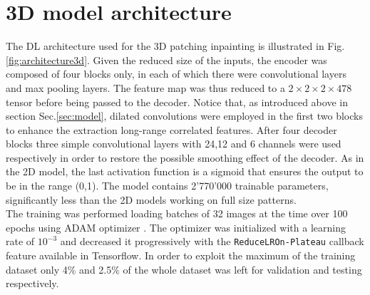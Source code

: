 \section{3D model architecture}

The DL architecture used for the 3D patching inpainting is illustrated in Fig. \ref{fig:architecture3d}.  
Given the reduced size of the inputs, the encoder was composed of four blocks only, in each of which there
were convolutional layers and max pooling layers. The feature map was thus reduced to a $2\times2\times2\times478$ tensor 
before being passed to the decoder. Notice that, as introduced above in section Sec.\ref{sec:model},
dilated convolutions were employed in the first two blocks to enhance the extraction long-range correlated features. 
After four decoder blocks three simple convolutional layers with 24,12 and 6 channels were used respectively in 
order to restore the possible smoothing effect of the decoder. As in the 2D model, the last activation function is 
a sigmoid that ensures the output to be in the range (0,1). 
The model contains 2'770'000 trainable parameters, significantly less than the 2D models working on full size patterns. 
\\
The training was performed loading batches of 32 images at the time over 100 epochs using ADAM optimizer \cite{ADAM}. 
The optimizer was initialized with a learning rate of $10^{-3}$ and decreased it progressively with the 
\texttt{ReduceLROn-Plateau} callback feature available in Tensorflow. In order to exploit the maximum of the training 
dataset only 4\% and 2.5\% of the whole dataset was left for validation and testing respectively.  

